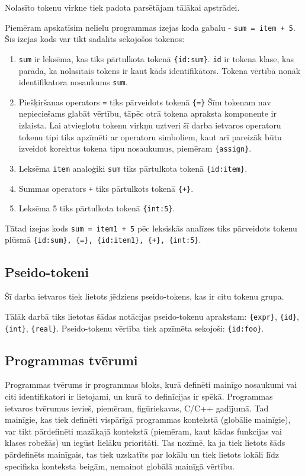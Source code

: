 Nolasīto tokenu virkne tiek padota parsētājam tālākai apstrādei.

Piemēram apskatīsim nelielu programmas izejas koda gabalu - \verb|sum = item + 5|. Šīs izejas kods var tikt sadalīts sekojošos tokenos:
\begin{enumerate}
\item \verb|sum| ir leksēma, kas tiks pārtulkota tokenā \verb|{id:sum}|. \verb|id| ir tokena klase, kas parāda, ka nolasītais tokens ir kaut kāds identifikātors. Tokena vērtībā nonāk identifikatora nosaukums \verb|sum|.
\item Piešķiršanas operators \verb|=| tiks pārveidots tokenā \verb|{=}| Šīm tokenam nav nepieciešams glabāt vērtību, tāpēc otrā tokena apraksta komponente ir izlaista. Lai atvieglotu tokenu virkņu uztveri šī darba ietvaros operatoru tokenu tipi tiks apzīmēti ar operatoru simboliem, kaut arī pareizāk būtu izveidot korektus tokena tipu nosaukumus, piemēram \verb|{assign}|.
\item Leksēma \verb|item| analoģiki \verb|sum| tiks pārtulkota tokenā \verb|{id:item}|.
\item Summas operators \verb|+| tiks pārtulkots tokenā \verb|{+}|.
\item Leksēma 5 tiks pārtulkota tokenā \verb|{int:5}|.
\end{enumerate}

Tātad izejas kods \verb|sum = item1 + 5| pēc leksiskās analīzes tiks pārveidots tokenu plūsmā \verb|{id:sum}, {=}, {id:item1}, {+}, {int:5}|. \cite{DragonBook}

\subsection{Pseido-tokeni}
Šī darba ietvaros tiek lietots jēdziens pseido-tokens, kas ir citu tokenu grupa.

Tālāk darbā tiks lietotas šādas notācijas pseido-tokenu aprakstam: \verb|{expr}|, \verb|{id}|, \verb|{int}|, \verb|{real}|. Pseido-tokenu vērtība tiek apzīmēta sekojoši: \verb|{id:foo}|. %

\subsection{Programmas tvērumi}
Programmas tvērums ir programmas bloks, kurā definēti mainīgo nosaukumi vai citi identifikatori ir lietojami, un kurā to definīcijas ir spēkā. Programmas ietvaros tvērumus ievieš, piemēram, figūriekavas, C/C++ gadījumā. Tad mainīgie, kas tiek definēti vispārīgā programmas kontekstā (globālie mainīgie), var tikt pārdefinēti mazākajā kontekstā (piemēram, kaut kādas funkcijas vai klases robežās) un iegūst lielāku prioritāti. Tas nozīmē, ka ja tiek lietots šāds pārdefinēts mainīgais, tas tiek uzskatīts par lokālu un tiek lietots lokāli līdz specifiska konteksta beigām, nemainot globālā mainīgā vērtību.

